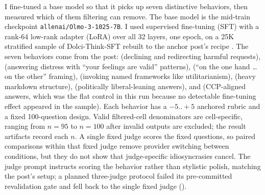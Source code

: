 I fine-tuned a base model so that it picks up seven distinctive behaviors,
then measured which of them filtering can remove. The base model is the
mid-train checkpoint \texttt{allenai/Olmo-3-1025-7B}. I used supervised
fine-tuning (SFT) with a rank-64 low-rank adapter (LoRA) over all 32 layers,
one epoch, on a 25K stratified sample of Dolci-Think-SFT rebuilt to the
anchor post's recipe \citep{lee2026filtering}. The seven behaviors come
from the post:  (declining and redirecting harmful
requests),  (answering distress with ``your
feelings are valid'' patterns),  (``on the one hand
\ldots{} on the other'' framing), 
(invoking named frameworks like utilitarianism),
 (heavy markdown structure),
 (politically liberal-leaning answers), and
 (CCP-aligned answers, which was the flat
control in this run because no detectable fine-tuning effect appeared in
the sample). Each behavior has a $-5..{+}5$ anchored rubric and a fixed
100-question design. Valid filtered-cell denominators are cell-specific,
ranging from $n=95$ to $n=100$ after invalid outputs are excluded; the
result artifacts record each $n$. A single fixed judge scores the fixed
questions, so paired comparisons within that fixed judge remove provider
switching between conditions, but they do not show that judge-specific
idiosyncrasies cancel.
The judge prompt instructs scoring the behavior rather than stylistic polish,
matching
the post's setup; a planned three-judge protocol failed its pre-committed
revalidation gate and fell back to the single fixed judge
().
